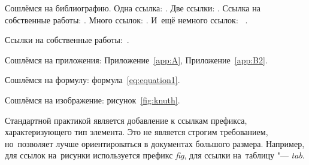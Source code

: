 Сошлёмся на библиографию.
Одна ссылка: \cite[с.~54]{Sokolov}\cite[с.~36]{Gaidaenko}.
Две ссылки: \cite{Sokolov,Gaidaenko}.
Ссылка на собственные работы: \cite{vakbib1, confbib2}.
Много ссылок: %
\cite{Lermontov, Management, Borozda, Marketing, Constitution, FamilyCode,
    Gost.7.0.53, Razumovski, Lagkueva, Pokrovski, Methodology, Berestova,
    Kriger}%
%
.
И~ещё немного ссылок:~\cite{Article,Book,Booklet,Conference,Inbook,Incollection,Manual,Mastersthesis,
    Misc,Phdthesis,Proceedings,Techreport,Unpublished}
\cite{medvedev2006jelektronnye, CEAT:CEAT581, doi:10.1080/01932691.2010.513279,
    Gosele1999161,Li2007StressAnalysis, Shoji199895, test:eisner-sample,
    test:eisner-sample-shorted, AB_patent_Pomerantz_1968, iofis_patent1960}%
%
.

%

Ссылки на собственные работы:~\cite{vakbib1, confbib1}.

Сошлёмся на приложения: Приложение~\cref{app:A}, Приложение~\cref{app:B2}.

Сошлёмся на формулу: формула~\cref{eq:equation1}.

Сошлёмся на изображение: рисунок~\cref{fig:knuth}.

Стандартной практикой является добавление к ссылкам префикса, характеризующего тип элемента.
Это не является строгим требованием, но~позволяет лучше ориентироваться в документах большого размера.
Например, для ссылок на~рисунки используется префикс \textit{fig},
для ссылки на~таблицу "--- \textit{tab}.

